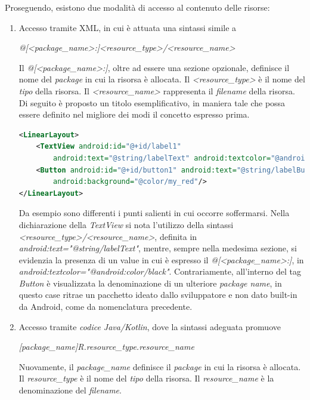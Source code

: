 \documentclass{article}
\begin{document}
Proseguendo, esistono due modalità di accesso al contenuto delle risorse:
\begin{enumerate}
    \itemsep0em
    \renewcommand*{\labelenumi}{-}
    \item Accesso tramite XML, in cui è attuata una sintassi simile a
    \begin{center}
        \textit{@[<package\_name>:]<resource\_type>/<resource\_name>}
    \end{center}
    Il \textit{@[<package\_name>:]}, oltre ad essere una sezione opzionale, definisce il nome del \textit{package} in cui la risorsa è allocata. Il \textit{<resource\_type>} è il nome del \textit{tipo} della risorsa. Il \textit{<resource\_name>} rappresenta il \textit{filename} della risorsa.\vspace*{7pt}\\
    Di seguito è proposto un titolo esemplificativo, in maniera tale che possa essere definito nel migliore dei modi il concetto espresso prima.
    \begin{lstlisting}[language=XML, title=Accesso al contenuto delle risorse mediante XML]
<LinearLayout>
    <TextView android:id="@+id/label1"
        android:text="@string/labelText" android:textcolor="@android:color/black"/>
    <Button android:id="@+id/button1" android:text="@string/labelButton"
        android:background="@color/my_red"/>
</LinearLayout>
    \end{lstlisting}
    Da esempio sono differenti i punti salienti in cui occorre soffermarsi. Nella dichiarazione della \textit{TextView} si nota l'utilizzo della sintassi \textit{<resource\_type>/<resource\_name>}, definita in \textit{android:text="@string/labelText"}, mentre, sempre nella medesima sezione, si evidenzia la presenza di un value in cui è espresso il \textit{@[<package\_name>:]}, in \textit{android:textcolor="@android:color/black"}. Contrariamente, all'interno del tag \textit{Button} è visualizzata la denominazione di un ulteriore \textit{package name}, in questo case ritrae un pacchetto ideato dallo sviluppatore e non dato built-in da Android, come da nomenclatura precedente.
    \item Accesso tramite \textit{codice Java/Kotlin}, dove la sintassi adeguata promuove
    \begin{center}
        \textit{[package\_name]R.resource\_type.resource\_name}
    \end{center}
    Nuovamente, il \textit{package\_name} definisce il \textit{package} in cui la risorsa è allocata. Il \textit{resource\_type} è il nome del \textit{tipo} della risorsa. Il \textit{resource\_name} è la denominazione del \textit{filename}.\\

\end{enumerate}
\end{document}
